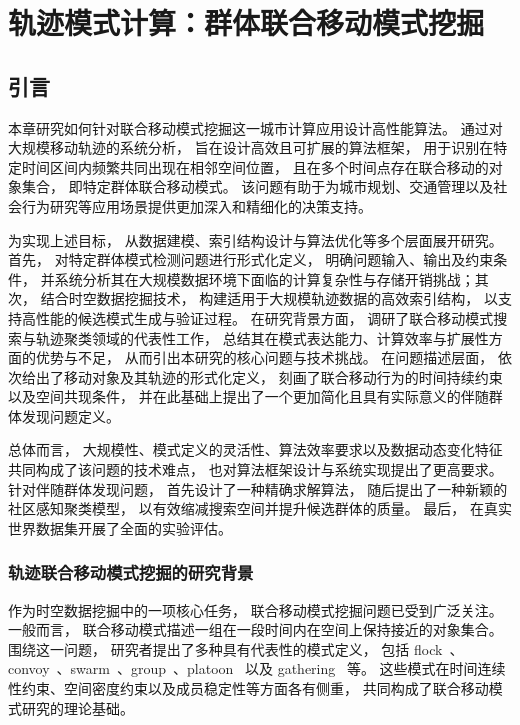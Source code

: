 \chapter{轨迹模式计算：群体联合移动模式挖掘}
\label{cha:comovement}
\section{引言}
本章研究如何针对联合移动模式挖掘这一城市计算应用设计高性能算法。 通过对大规模移动轨迹的系统分析， 旨在设计高效且可扩展的算法框架， 用于识别在特定时间区间内频繁共同出现在相邻空间位置， 且在多个时间点存在联合移动的对象集合， 即特定群体联合移动模式。 该问题有助于为城市规划、交通管理以及社会行为研究等应用场景提供更加深入和精细化的决策支持。

为实现上述目标， 从数据建模、索引结构设计与算法优化等多个层面展开研究。 首先， 对特定群体模式检测问题进行形式化定义， 明确问题输入、输出及约束条件， 并系统分析其在大规模数据环境下面临的计算复杂性与存储开销挑战；其次， 结合时空数据挖掘技术， 构建适用于大规模轨迹数据的高效索引结构， 以支持高性能的候选模式生成与验证过程。 在研究背景方面， 调研了联合移动模式搜索与轨迹聚类领域的代表性工作， 总结其在模式表达能力、计算效率与扩展性方面的优势与不足， 从而引出本研究的核心问题与技术挑战。 在问题描述层面， 依次给出了移动对象及其轨迹的形式化定义， 刻画了联合移动行为的时间持续约束以及空间共现条件， 并在此基础上提出了一个更加简化且具有实际意义的伴随群体发现问题定义。

总体而言， 大规模性、模式定义的灵活性、算法效率要求以及数据动态变化特征共同构成了该问题的技术难点， 也对算法框架设计与系统实现提出了更高要求。 针对伴随群体发现问题， 首先设计了一种精确求解算法， 随后提出了一种新颖的社区感知聚类模型， 以有效缩减搜索空间并提升候选群体的质量。 最后， 在真实世界数据集开展了全面的实验评估。

\subsection{轨迹联合移动模式挖掘的研究背景}

作为时空数据挖掘中的一项核心任务， 联合移动模式挖掘问题已受到广泛关注。 一般而言， 联合移动模式描述一组在一段时间内在空间上保持接近的对象集合。 围绕这一问题， 研究者提出了多种具有代表性的模式定义， 包括 flock~、convoy~、swarm~、group~、platoon~ 以及 gathering~ 等。 这些模式在时间连续性约束、空间密度约束以及成员稳定性等方面各有侧重， 共同构成了联合移动模式研究的理论基础。

